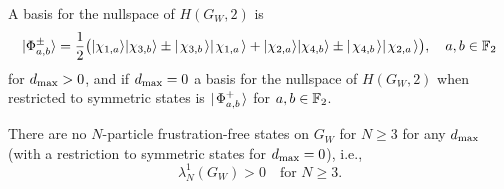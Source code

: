 \documentclass[../thesis-main/thesis-main]{subfiles}
\begin{document}
\begin{lemma}
\label{lem:Wgadget_lemma}
A basis for the nullspace of $H(G_{W},2)$ is 
\begin{equation}
  |\Phi_{a,b}^{\pm}\rangle= \frac{1}{2} \big( |\chi_{1,a}\rangle|\chi_{3,b}\rangle \pm |\mspace{2mu} \chi_{3,b} \mspace{2mu} \rangle{|\mspace{2mu}\chi_{1,a} \mspace{2mu}\rangle} 
  + |\chi_{2,a}\rangle|\chi_{4,b}\rangle \pm |\mspace{2mu} \chi_{4,b} \mspace{2mu} \rangle|\mspace{2mu} \chi_{2,a} \mspace{2mu} \rangle\big),\quad a,b\in \mathbb{F}_2\label{eq:phi_a1_a2}
\end{equation}
for $d_{\text{max}} > 0$, and if $d_{\text{max}} = 0$ a basis for the nullspace of $H(G_{W},2)$ when restricted to symmetric states is $|\mspace{2mu} \Phi_{a,b}^+ \mspace{2mu} \rangle$ for $a,b\in \mathbb{F}_2$.  

There are no $N$-particle frustration-free states on $G_{W}$ for $N\geq3$ for any $d_{\text{max}}$ (with a restriction to symmetric states for $d_{\text{max}} = 0$), i.e.,
\begin{equation}
\lambda_{N}^{1}(G_{W})>0\quad\text{for }N\geq3.
\end{equation}
\end{lemma}
\end{document}
